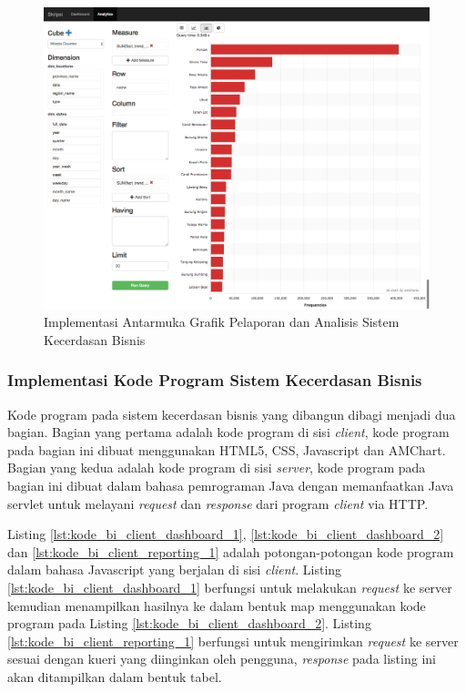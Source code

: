 \begin{figure}[H]
	\centering
	\includegraphics[scale=0.35]{Gambar/ui-implementasi-bi-reporting-03.png}
	\caption[Implementasi Antarmuka Grafik Pelaporan dan Analisis Sistem Kecerdasan Bisnis]{Implementasi Antarmuka Grafik Pelaporan dan Analisis Sistem Kecerdasan Bisnis} 
	\label{fig:ui_implementasi_bi_reporting_3}
\end{figure}

\subsubsection{Implementasi Kode Program Sistem Kecerdasan Bisnis}
Kode program pada sistem kecerdasan bisnis yang dibangun dibagi menjadi dua bagian. Bagian yang pertama adalah kode program di sisi \textit{client}, kode program pada bagian ini dibuat menggunakan HTML5, CSS, Javascript dan AMChart. Bagian yang kedua adalah kode program di sisi \textit{server}, kode program pada bagian ini dibuat dalam bahasa pemrograman Java dengan memanfaatkan Java servlet untuk melayani \textit{request} dan \textit{response} dari program \textit{client} via HTTP. 

Listing \ref{lst:kode_bi_client_dashboard_1}, \ref{lst:kode_bi_client_dashboard_2} dan \ref{lst:kode_bi_client_reporting_1} adalah potongan-potongan kode program dalam bahasa Javascript yang berjalan di sisi \textit{client}. Listing \ref{lst:kode_bi_client_dashboard_1} berfungsi untuk melakukan \textit{request} ke server kemudian menampilkan hasilnya ke dalam bentuk map menggunakan kode program pada Listing \ref{lst:kode_bi_client_dashboard_2}. Listing \ref{lst:kode_bi_client_reporting_1} berfungsi untuk mengirimkan \textit{request} ke server sesuai dengan kueri yang diinginkan oleh pengguna, \textit{response} pada listing ini akan ditampilkan dalam bentuk tabel.

